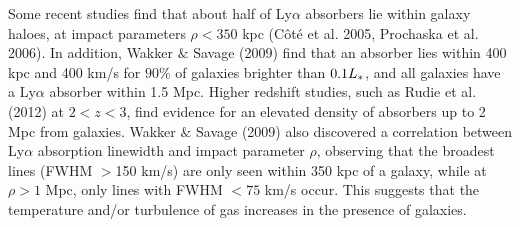 \documentclass[iop]{emulateapj-rtx4}
\begin{document}



Some recent studies find that about half of Ly$\alpha$ absorbers lie within galaxy haloes, at impact parameters $\rho<350$ kpc (C\^{o}t\'{e} et al. 2005, Prochaska et al. 2006). In addition, Wakker $\&$ Savage (2009) find that an absorber lies within 400 kpc and 400 km/s for $90\%$ of galaxies brighter than $0.1L_{\**}$, and all galaxies have a Ly$\alpha$ absorber within 1.5 Mpc. Higher redshift studies, such as Rudie et al. (2012) at $2<z<3$, find evidence for an elevated density of absorbers up to 2 Mpc from galaxies. Wakker $\&$ Savage (2009) also discovered a correlation between Ly$\alpha$ absorption linewidth and impact parameter $\rho$, observing that the broadest lines (FWHM $>$150 km/s) are only seen within 350 kpc of a galaxy, while at $\rho>1$ Mpc, only lines with FWHM $<75$ km/s occur. This suggests that the temperature and/or turbulence of gas increases in the presence of galaxies.
\end{document}
